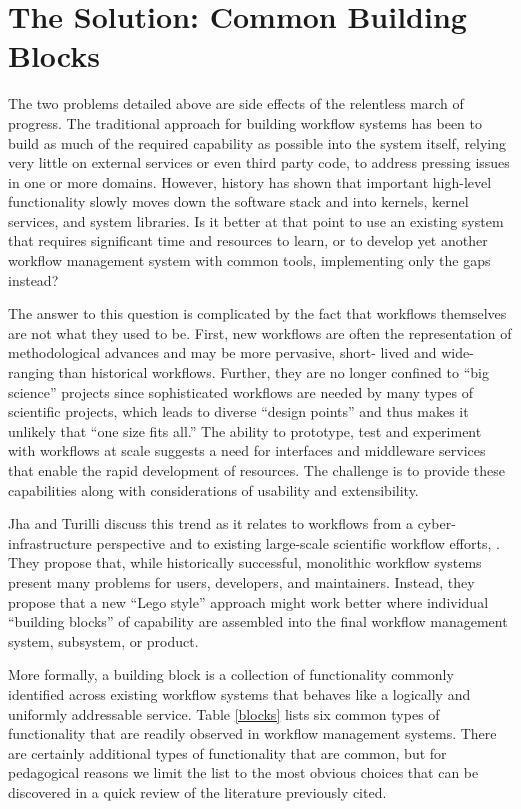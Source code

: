 \section{The Solution: Common Building Blocks}\label{buildings-blocks}

The two problems detailed above are side effects of the relentless march of
progress. The traditional approach for building workflow systems has been to
build as much of the required capability as possible into the system itself,
relying very little on external services or even third party code, to address
pressing issues in one or more domains. However, history has shown that
important high-level functionality slowly moves down the software stack and
into kernels, kernel services, and system libraries. Is it better at that
point to use an existing system that requires significant time and resources
to learn, or to develop yet another workflow management system with common
tools, implementing only the gaps instead?

The answer to this question is complicated by the fact that workflows
themselves are not what they used to be. First, new workflows are often the
representation of methodological advances and may be more pervasive,  short-
lived and wide-ranging than historical workflows. Further, they are no longer
confined to ``big science'' projects since sophisticated workflows are needed
by many types of scientific projects, which leads to diverse ``design points'' and thus
makes it unlikely that ``one size fits all.''  The ability to prototype, test
and experiment with workflows at scale suggests a need for interfaces and
middleware services that enable the rapid development of resources. The
challenge is to provide these capabilities along with considerations of
usability and extensibility.

Jha and Turilli discuss this trend as it relates to workflows from a 
cyber-infrastructure perspective and to existing large-scale scientific workflow
efforts, \cite{jha_building_2016}. They propose that, while historically
successful, monolithic workflow systems present many problems for users,
developers, and maintainers. Instead, they propose that a new ``Lego style''
approach might work better where individual ``building blocks'' of capability
are assembled into the final workflow management system, subsystem, or
product.

More formally, a building block is a collection of functionality commonly
identified across existing workflow systems that behaves like a logically and
uniformly addressable service. Table \ref{blocks} lists six common types of
functionality that are readily observed in workflow management systems. There
are certainly additional types of functionality that are common, but for
pedagogical reasons we limit the list to the most obvious choices that can be
discovered in a quick review of the literature previously cited.

